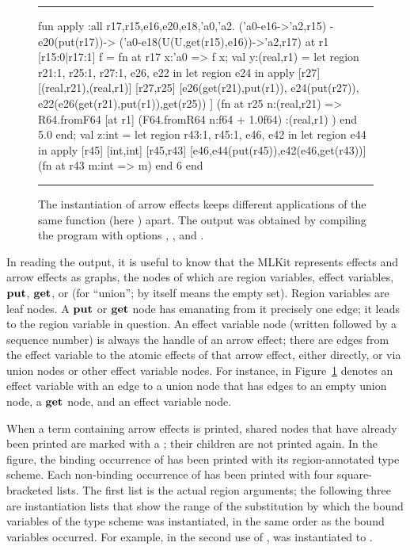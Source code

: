 \documentclass[12pt]{book}
\begin{document}
\begin{figure}
\hrule \medskip
\begin{smlcode}
  fun apply :all r17,r15,e16,e20,e18,'a0,'a2.
             ('a0-e16->'a2,r15) -e20(put(r17))->
             ('a0-e18(U(U,get(r15),e16))->'a2,r17)
      at r1 [r15:0|r17:1] f = fn at r17 x:'a0 => f x;
  val y:(real,r1) =
    let region r21:1, r25:1, r27:1, e26, e22
    in   let region e24
         in  apply [r27]
                   [(real,r21),(real,r1)]
                   [r27,r25]
                   [e26(get(r21),put(r1)),
                    e24(put(r27)),
                    e22(e26(get(r21),put(r1)),get(r25))
                   ]
             (fn at r25 n:(real,r21) =>
                R64.fromF64 [at r1] (F64.fromR64 n:f64 + 1.0f64)
                :(real,r1)
             )
         end
         5.0
    end;
  val z:int =
    let region r43:1, r45:1, e46, e42
    in   let region e44
         in  apply [r45]
                   [int,int]
                   [r45,r43]
                   [e46,e44(put(r45)),e42(e46,get(r43))]
             (fn at r43 m:int => m)
         end
         6
    end
\end{smlcode}
\caption{The instantiation of arrow effects keeps different applications of the
  same function (here ) apart. The output was obtained by compiling
  the program  with options ,
  ,  and .}  \medskip
\hrule
\label{apply.fig}
\end{figure}

In reading the output, it is useful to know that the MLKit represents effects
and arrow effects as graphs, the nodes of which are region variables, effect
variables, $\mathop{\bf put}\nolimits$, $\mathop{\bf get}\nolimits$, or  (for ``union'';  by itself means the
empty set).  Region variables are leaf nodes. A $\mathop{\bf put}\nolimits$ or $\mathop{\bf get}\nolimits$ node has
emanating from it precisely one edge; it leads to the region variable in
question.  An effect variable node (written  followed by a sequence
number) is always the handle of an arrow effect; there are edges from the effect
variable to the atomic effects of that arrow effect, either directly, or via
union nodes or other effect variable nodes.  For instance,
 in Figure~\ref{apply.fig} denotes an effect variable with an edge
to a union node that has edges to an empty union node, a $\mathop{\bf get}\nolimits$ node, and an
effect variable node.

When a term containing arrow effects is printed, shared nodes that have already
been printed are marked with a ; their children are not printed again.
In the figure, the binding occurrence of  has been printed with its
region-annotated type scheme. Each non-binding occurrence of  has been
printed with four square-bracketed lists. The first list is the actual region
arguments; the following three are instantiation lists that show the range of
the substitution by which the bound variables of the type scheme was
instantiated, in the same order as the bound variables occurred.  For example,
in the second use of ,  was instantiated to .
\end{document}
